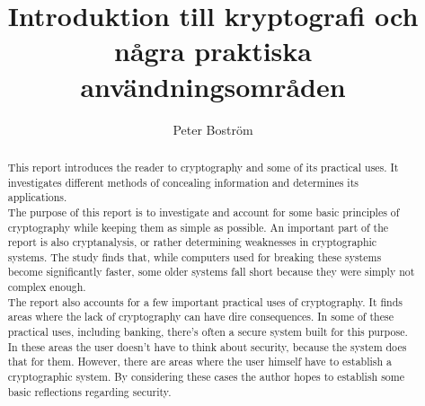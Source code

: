 \documentclass{article}
\title{Introduktion till kryptografi och några praktiska användningsområden}
\author{Peter Boström}
\begin{document}
\maketitle
\thispagestyle{empty}
\newpage


\begin{abstract}

\noindent This report introduces the reader to cryptography and some of its practical uses. It investigates different methods of concealing information and determines its applications. \\

\noindent The purpose of this report is to investigate and account for some basic principles of cryptography while keeping them as simple as possible. An important part of the report is also cryptanalysis, or rather determining weaknesses in cryptographic systems. The study finds that, while computers used for breaking these systems become significantly faster, some older systems fall short because they were simply not complex enough. \\

\noindent The report also accounts for a few important practical uses of cryptography. It finds areas where the lack of cryptography can have dire consequences. In some of these practical uses, including banking, there's often a secure system built for this purpose. In these areas the user doesn't have to think about security, because the system does that for them. However, there are areas where the user himself have to establish a cryptographic system. By considering these cases the author hopes to establish some basic reflections regarding security. \\



\end{abstract}

\newpage

\end{document}
